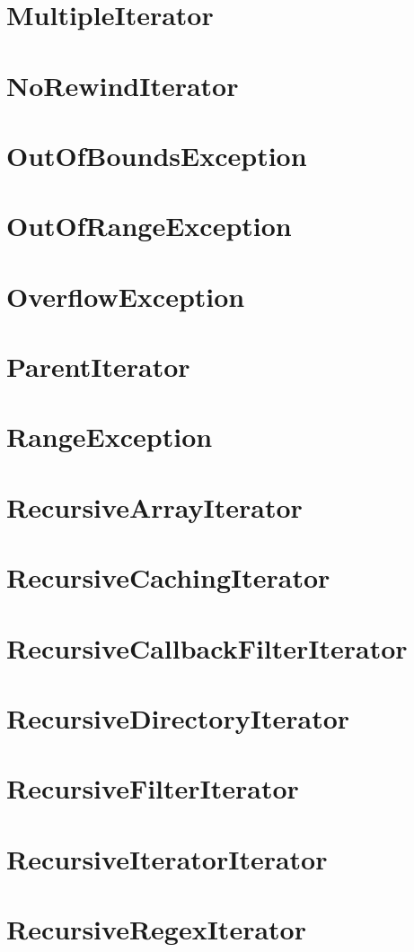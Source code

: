 \section{MultipleIterator}
\section{NoRewindIterator}
\section{OutOfBoundsException}
\section{OutOfRangeException}
\section{OverflowException}
\section{ParentIterator}
\section{RangeException}
\section{RecursiveArrayIterator}
\section{RecursiveCachingIterator}
\section{RecursiveCallbackFilterIterator}
\section{RecursiveDirectoryIterator}
\section{RecursiveFilterIterator}
\section{RecursiveIteratorIterator}
\section{RecursiveRegexIterator}
